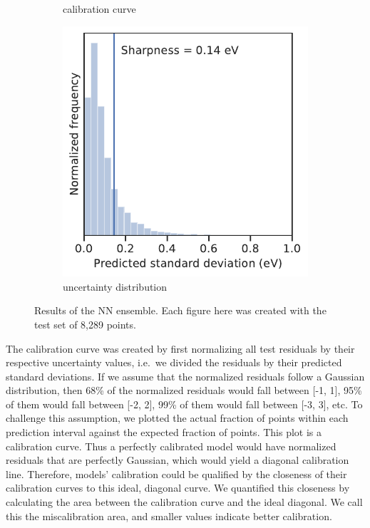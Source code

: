 \documentclass[]{achemso}
\begin{document}
\begin{figure}
\begin{subfigure}[b]{0.32\textwidth}
        \caption{calibration curve}\label{fig:calibration_example}
    \end{subfigure}
    \begin{subfigure}[b]{0.32\textwidth}
        \includegraphics[width=\textwidth]{../NN_ensemble/sharpness.pdf}
        \caption{uncertainty distribution}\label{fig:sharpness_example}
    \end{subfigure}
    \caption{Results of the \gls{NN} ensemble. Each figure here was created with the test set of 8,289 points.}\label{fig:results_example}
\end{figure}

The calibration curve was created by first normalizing all test residuals by their respective uncertainty values, i.e.\ we divided the residuals by their predicted standard deviations.
If we assume that the normalized residuals follow a Gaussian distribution, then 68\% of the normalized residuals would fall between [-1, 1], 95\% of them would fall between [-2, 2], 99\% of them would fall between [-3, 3], etc.
To challenge this assumption, we plotted the actual fraction of points within each prediction interval against the expected fraction of points.
This plot is a calibration curve.
Thus a perfectly calibrated model would have normalized residuals that are perfectly Gaussian, which would yield a diagonal calibration line.
Therefore, models' calibration could be qualified by the closeness of their calibration curves to this ideal, diagonal curve.
We quantified this closeness by calculating the area between the calibration curve and the ideal diagonal.
We call this the miscalibration area, and smaller values indicate better calibration.
\end{document}
